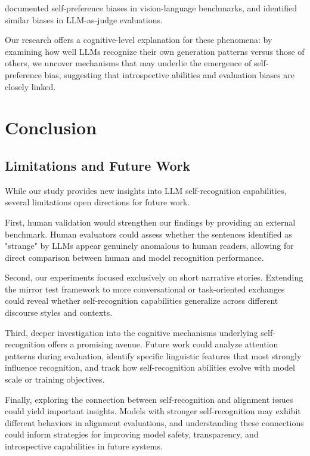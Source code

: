 \documentclass{article}
\begin{document}
\citet{bitton2023visit} documented self-preference biases in vision-language benchmarks, and \citet{zheng2023judging} identified similar biases in LLM-as-judge evaluations. 

Our research offers a cognitive-level explanation for these phenomena: by examining how well LLMs recognize their own generation patterns versus those of others, we uncover mechanisms that may underlie the emergence of self-preference bias, suggesting that introspective abilities and evaluation biases are closely linked.


\section{Conclusion}

\subsection{Limitations and Future Work}

While our study provides new insights into LLM self-recognition capabilities, several limitations open directions for future work.

First, human validation would strengthen our findings by providing an external benchmark. Human evaluators could assess whether the sentences identified as "strange" by LLMs appear genuinely anomalous to human readers, allowing for direct comparison between human and model recognition performance.

Second, our experiments focused exclusively on short narrative stories. Extending the mirror test framework to more conversational or task-oriented exchanges could reveal whether self-recognition capabilities generalize across different discourse styles and contexts.

Third, deeper investigation into the cognitive mechanisms underlying self-recognition offers a promising avenue. Future work could analyze attention patterns during evaluation, identify specific linguistic features that most strongly influence recognition, and track how self-recognition abilities evolve with model scale or training objectives.

Finally, exploring the connection between self-recognition and alignment issues could yield important insights. Models with stronger self-recognition may exhibit different behaviors in alignment evaluations, and understanding these connections could inform strategies for improving model safety, transparency, and introspective capabilities in future systems.
\end{document}
